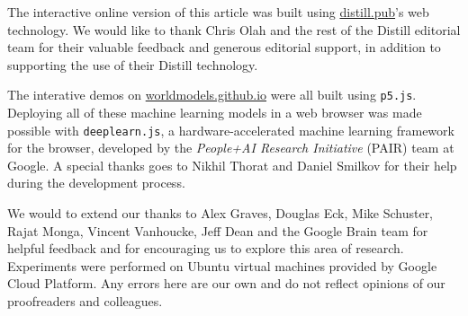 \documentclass{article}
\begin{document}
The interactive online version of this article was built using \url{distill.pub}'s web technology. We would like to thank Chris Olah and the rest of the Distill editorial team for their valuable feedback and generous editorial support, in addition to supporting the use of their Distill technology.

The interative demos on \url{worldmodels.github.io} were all built using \texttt{p5.js}. Deploying all of these machine learning models in a web browser was made possible with \texttt{deeplearn.js}, a hardware-accelerated machine learning framework for the browser, developed by the \textit{People+AI Research Initiative} (PAIR) team at Google. A special thanks goes to Nikhil Thorat and Daniel Smilkov for their help during the development process.

We would to extend our thanks to Alex Graves, Douglas Eck, Mike Schuster, Rajat Monga, Vincent Vanhoucke, Jeff Dean and the Google Brain team for helpful feedback and for encouraging us to explore this area of research. Experiments were performed on Ubuntu virtual machines provided by Google Cloud Platform. Any errors here are our own and do not reflect opinions of our proofreaders and colleagues.

%








\end{document}
